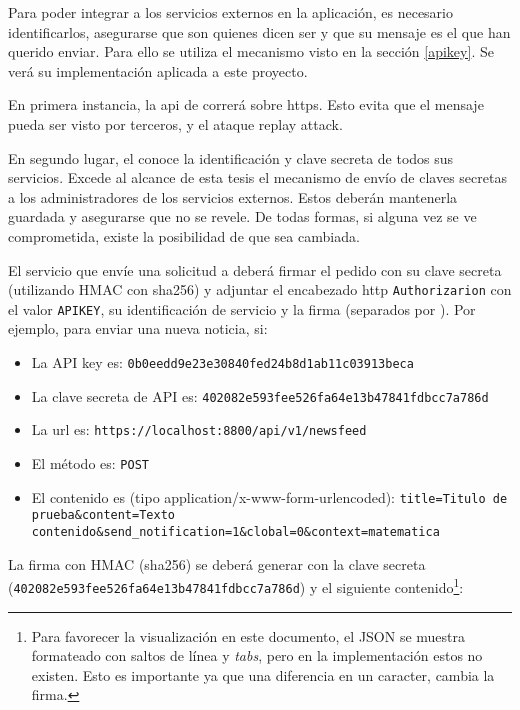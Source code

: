 Para poder integrar a los servicios externos en la aplicación, es necesario identificarlos, asegurarse que son quienes dicen ser y que su mensaje es el que han querido enviar. Para ello se utiliza el mecanismo visto en la sección \ref{apikey}. Se verá su implementación aplicada a este proyecto.

En primera instancia, la \gls{api} de \nombreApp{} correrá sobre \gls{https}. Esto evita que el mensaje pueda ser visto por terceros, y el ataque \gls{replay attack}.

En segundo lugar, el  conoce la identificación y clave secreta de todos sus servicios. Excede al alcance de esta tesis el mecanismo de envío de claves secretas a los administradores de los servicios externos. Estos deberán mantenerla guardada y asegurarse que no se revele. De todas formas, si alguna vez se ve comprometida, existe la posibilidad de que sea cambiada.

El servicio que envíe una solicitud a \nombreApp{} deberá firmar el pedido con su clave secreta (utilizando HMAC con sha256) y adjuntar el encabezado \gls{http} \lstinline{Authorizarion} con el valor \lstinline{APIKEY}, su identificación de servicio y la firma (separados por ). Por ejemplo, para enviar una nueva noticia, si:
\begin{itemize}
\item La API key es: \lstinline{0b0eedd9e23e30840fed24b8d1ab11c03913beca}

\item La clave secreta de API es: \lstinline{402082e593fee526fa64e13b47841fdbcc7a786d}

\item La \gls{url} es: \lstinline{https://localhost:8800/api/v1/newsfeed}

\item El método es: \lstinline{POST}

\item El contenido es (tipo application/x-www-form-urlencoded): \lstinline{title=Titulo de prueba&content=Texto contenido&send_notification=1&clobal=0&context=matematica}

\end{itemize}

La firma con HMAC (sha256) se deberá generar con la clave secreta (\lstinline{402082e593fee526fa64e13b47841fdbcc7a786d}) y el siguiente contenido\footnote{Para favorecer la visualización en este documento, el JSON se muestra formateado con saltos de línea y \textit{tabs}, pero en la implementación estos no existen. Esto es importante ya que una diferencia en un caracter, cambia la firma.}:

